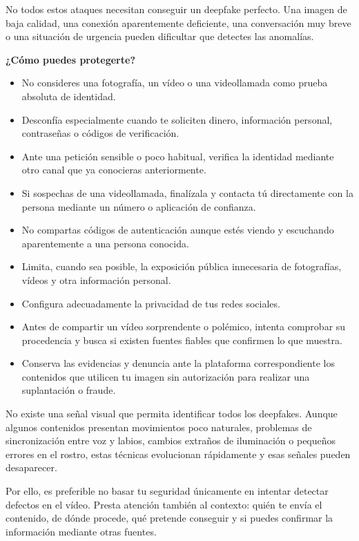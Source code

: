 \documentclass[
  spanish,
  a4paper,
  openany]{book}
\begin{document}
No todos estos ataques necesitan conseguir un deepfake perfecto. Una imagen de baja calidad, una conexión aparentemente deficiente, una conversación muy breve o una situación de urgencia pueden dificultar que detectes las anomalías.

\textbf{¿Cómo puedes protegerte?}

\begin{itemize}
\item
  No consideres una fotografía, un vídeo o una videollamada como prueba absoluta de identidad.
\item
  Desconfía especialmente cuando te soliciten dinero, información personal, contraseñas o códigos de verificación.
\item
  Ante una petición sensible o poco habitual, verifica la identidad mediante otro canal que ya conocieras anteriormente.
\item
  Si sospechas de una videollamada, finalízala y contacta tú directamente con la persona mediante un número o aplicación de confianza.
\item
  No compartas códigos de autenticación aunque estés viendo y escuchando aparentemente a una persona conocida.
\item
  Limita, cuando sea posible, la exposición pública innecesaria de fotografías, vídeos y otra información personal.
\item
  Configura adecuadamente la privacidad de tus redes sociales.
\item
  Antes de compartir un vídeo sorprendente o polémico, intenta comprobar su procedencia y busca si existen fuentes fiables que confirmen lo que muestra.
\item
  Conserva las evidencias y denuncia ante la plataforma correspondiente los contenidos que utilicen tu imagen sin autorización para realizar una suplantación o fraude.
\end{itemize}

No existe una señal visual que permita identificar todos los deepfakes. Aunque algunos contenidos presentan movimientos poco naturales, problemas de sincronización entre voz y labios, cambios extraños de iluminación o pequeños errores en el rostro, estas técnicas evolucionan rápidamente y esas señales pueden desaparecer.

Por ello, es preferible no basar tu seguridad únicamente en intentar detectar defectos en el vídeo. Presta atención también al contexto: quién te envía el contenido, de dónde procede, qué pretende conseguir y si puedes confirmar la información mediante otras fuentes.
\end{document}
